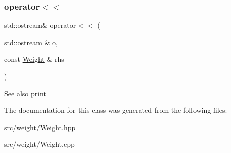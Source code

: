 \subsubsection{\texorpdfstring{operator$<$$<$}{operator<<}}
{\footnotesize\ttfamily std\+::ostream\& operator$<$$<$ (\begin{DoxyParamCaption}\item[{std\+::ostream \&}]{o,  }\item[{const \mbox{\hyperlink{classWeight}{Weight}} \&}]{rhs }\end{DoxyParamCaption})\hspace{0.3cm}{\ttfamily [friend]}}

\begin{DoxySeeAlso}{See also}
print 
\end{DoxySeeAlso}


The documentation for this class was generated from the following files\+:\begin{DoxyCompactItemize}
\item 
src/weight/Weight.\+hpp\item 
src/weight/Weight.\+cpp\end{DoxyCompactItemize}
